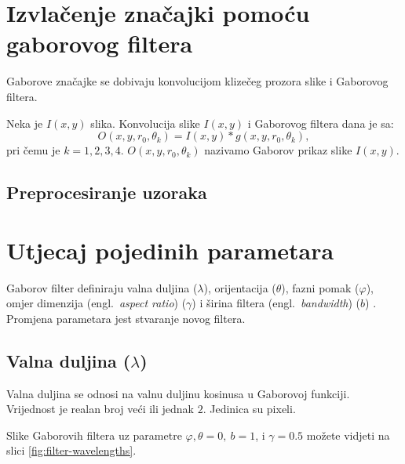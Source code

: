 \documentclass{article}
\newcommand{\engl}[1]{(engl.~\emph{#1})}
\begin{document}
\section{Izvlačenje značajki pomoću gaborovog filtera}
Gaborove značajke se dobivaju konvolucijom klizečeg prozora slike i Gaborovog
filtera.

Neka je $I(x,y)$ slika. Konvolucija slike $I(x,y)$ i Gaborovog filtera dana je
sa:
\begin{equation}
O(x,y,r_0, \theta_k) = I(x,y) * g(x,y,r_0, \theta_k),
\label{konvolucija-filter-slika}
\end{equation}
pri čemu je $k = 1, 2, 3, 4$. $O(x,y,r_0, \theta_k)$ nazivamo Gaborov prikaz
slike $I(x,y)$.

\subsection{Preprocesiranje uzoraka}

\section{Utjecaj pojedinih parametara}
Gaborov filter definiraju valna duljina ($\lambda$),
orijentacija ($\theta$), fazni pomak ($\varphi$), omjer dimenzija \engl{aspect ratio}
($\gamma $) i širina filtera \engl{bandwidth} ($b$) \citep{petkovgabor}.
Promjena parametara jest stvaranje novog filtera.

\subsection{Valna duljina ($\lambda$)}
Valna duljina se odnosi na valnu duljinu kosinusa u Gaborovoj funkciji.
Vrijednost je realan broj veći ili jednak $2$. Jedinica su pixeli.

Slike Gaborovih filtera uz parametre $\varphi, \theta = 0,\: b = 1$, i $\gamma =
0.5$ možete vidjeti na slici \ref{fig:filter-wavelengths}.
\end{document}
